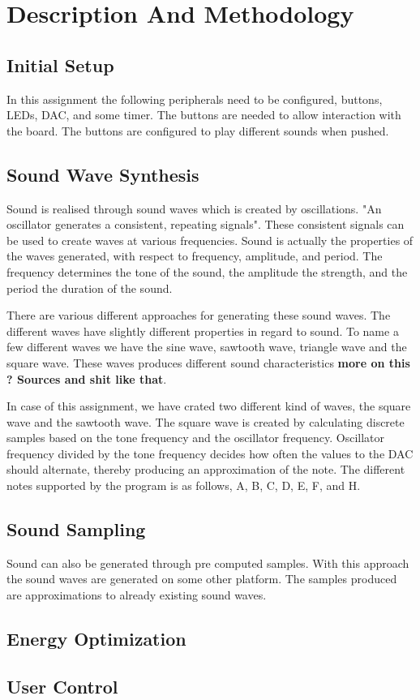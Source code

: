 \section{Description And Methodology}


\subsection{Initial Setup}
In this assignment the following peripherals need to be configured, buttons, LEDs, DAC, and some timer. The buttons are needed to allow interaction with the board. The buttons are configured to play different sounds when pushed. 




\subsection{Sound Wave Synthesis}
Sound is realised through sound waves which is created by oscillations. "An oscillator generates a consistent, repeating signals". These consistent signals can be used to create waves at various frequencies. Sound is actually the properties of the waves generated, with respect to frequency, amplitude, and period. The frequency determines the tone of the sound, the amplitude the strength, and the period the duration of the sound.  

There are various different approaches for generating these sound waves. The different waves have slightly different properties in regard to sound. To name a few different waves we have the sine wave, sawtooth wave, triangle wave and the square wave. These waves produces different sound characteristics {\bf more on this ? Sources and shit like that}. 

In case of this assignment, we have crated two different kind of waves, the square wave and the sawtooth wave. The square wave is created by calculating discrete samples based on the tone frequency and the oscillator frequency. Oscillator frequency divided by the tone frequency decides how often the values to the DAC should alternate, thereby producing an approximation of the note. The different notes supported by the program is as follows, A, B, C, D, E, F, and H.






\subsection{Sound Sampling}
Sound can also be generated through pre computed samples. With this approach the sound waves are generated on some other platform. The samples produced are approximations to already existing sound waves. 


\subsection{Energy Optimization}





\subsection{User Control}













